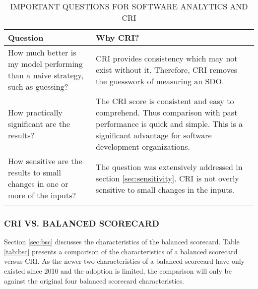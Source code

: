 \documentclass[SDSUThesis.tex]{subfiles}
\begin{document}
            \begin{longtable}{p{4cm}p{10cm}}
                
                \toprule%
                 \centering%
                 {\bfseries Question}
                 & {\bfseries Why CRI?} \\
                
                \cmidrule[0.4pt](r{0.125em}){1-1}%
                \cmidrule[0.4pt](lr{0.125em}){2-2}%
                \endhead
                
                How much better is my model performing than a naive strategy, such as guessing? & CRI 
                provides consistency which may not exist without it.  Therefore, CRI removes the 
                guesswork of measuring an SDO. \\
                \myrowcolour%
                How practically significant are the results? & The CRI score is consistent
                and easy to comprehend.  Thus comparison with past performance is quick 
                and simple.  This is a significant advantage for software 
                development organizations. \\
                How sensitive are the results to small changes in one or more of the inputs? & 
                The question was extensively addressed in section \ref{sec:sensitivity}. CRI is
                not overly sensitive to small changes in the inputs.\\
                
                \bottomrule
                
                \caption{IMPORTANT QUESTIONS FOR SOFTWARE ANALYTICS AND CRI}
                \label{tab:questions}
            \end{longtable}

        
        \subsubsection{CRI VS. BALANCED SCORECARD}
            Section \ref{sec:bsc} discusses the characteristics of the 
            balanced scorecard.  Table \ref{tab:bsc} presents a
            comparison of the characteristics of a balanced scorecard
            versus CRI.
            As the newer two characteristics of a balanced scorecard
            have only existed since 2010 and the adoption is limited,
            the comparison will only be against the original four balanced
            scorecard characteristics.
            
\end{document}
